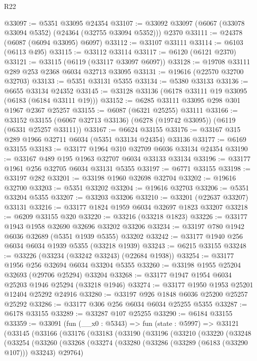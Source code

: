 \begin{lexlean}{R22}
\begin{coremodule}
@33097 := @5351 @33095 @24354
@33107 := @33092 @33097 (@6067 (@33078 @33094 @5352) (@24364 (@32755 @33094 @5352))) @2370
@33111 := @24378 (@6087 (@6094 @33095) @6097)
@33112 := @33107 @33111
@33114 := @6103 (@6113 @495)
@33115 := @33112 @33114
@33117 := @6120 (@6121 @2370)
@33121 := @33115 (@6119 (@33117 @33097 @6097))
@33128 := @19708 @33111 @289 @253 @2368 @6034 @32713 @33095
@33131 := @19616 (@22570 @32700 @32703)
@33133 := @5351 @33131 @5355
@33134 := @5380 @33133
@33136 := @6655 @33134 @24352
@33145 := @33128 @33136 (@6178 @33111 @19 @33095 (@6183 (@6184 @33111 @19)))
@33152 := @6285 @33111 @33095 @298 @301 @1967 @2367 @25257
@33155 := @6087 (@6321 @25255) @33111
@33166 := @33152 @33155 (@6067 @32713 @33136) (@6278 (@19742 @33095)) (@6119 (@6331 @25257 @33111))
@33167 := @6624 @33155
@33176 := @33167 @315 @289 @1966 @32711 @6034 (@5351 @33134 @24354) @33136
@33177 := @6169 @33155
@33183 := @33177 @1964 @310 @32709 @6036 @33134 @24354
@33190 := @33167 @489 @195 @1963 @32707 @6034 @33133 @33134
@33196 := @33177 @1961 @256 @32705 @6034 @33131 @5355
@33197 := @6771 @33155
@33198 := @33197 @282
@33201 := @33198 @1960 @32698 @32704
@33202 := @19616 @32700
@33203 := @5351 @33202
@33204 := @19616 @32703
@33206 := @5351 @33204 @5355
@33207 := @33203 @33206
@33210 := @33201 (@22637 @33207) @33131
@33216 := @33177 @1824 @1959 @6034 @32697 @1823 @33207
@33218 := @6209 @33155 @320
@33220 := @33216 (@33218 @1823)
@33226 := @33177 @1943 @1958 @32690 @32696 @33202 @33206
@33234 := @33197 @780 @1942 @6036 @32689 (@5351 @1939 @5355) @33202
@33242 := @33177 @1940 @256 @6034 @6034 @1939 @5355 (@33218 @1939)
@33243 := @6215 @33155
@33248 := @33226 (@33234 (@33242 @33243) (@22684 @1938))
@33254 := @33177 @1956 @256 @32694 @6034 @33204 @5355
@33260 := @33198 @1955 @25204 @32693 (@29706 @25294) @33204
@33268 := @33177 @1947 @1954 @6034 @25203 @1946 @25294 (@33218 @1946)
@33274 := @33177 @1950 @1953 @25201 @12404 @25292 @24916
@33280 := @33197 @926 @1848 @6036 @25200 @25257 @25292
@33286 := @33177 @306 @256 @6034 @6034 @25255 @5355
@33287 := @6178 @33155
@33289 := @33287 @107 @25255
@33290 := @6184 @33155
@33359 := @33091
    (fun (__x0 : @5343) =>
    fun (state : @5997) =>
    @33121
      (@33145
        (@33166
          (@33176
            (@33183
              (@33190
                (@33196
                  (@33210
                    (@33220
                      (@33248
                        (@33254
                          (@33260
                            (@33268
                              (@33274
                                (@33280 (@33286 (@33289 (@6183 (@33290 @107))) @33243) @29764)

\end{coremodule}
\end{lexlean}
